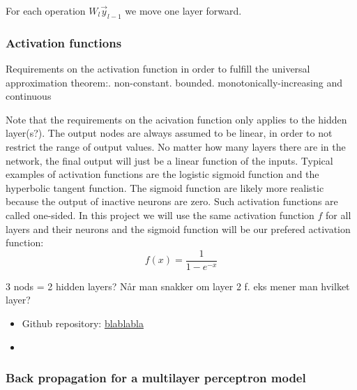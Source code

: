 \documentclass[a4paper,12pt]{article}
\begin{document}
For each operation $W_l \Vec{y}_{l-1}$ we move one layer forward.\newline


\subsubsection{Activation functions}
Requirements on the activation function in order to fulfill the universal approximation theorem:. non-constant. bounded. monotonically-increasing and continuous\newline

Note that the requirements on the acivation function only applies to the hidden layer(s?). The output nodes are always assumed to be linear, in order to not restrict the range of output values. No matter how many layers there are in the network, the final output will just be a linear function of the inputs.\newline
Typical examples of activation functions are the logistic sigmoid function and the hyperbolic tangent function. The sigmoid function are likely more realistic because the output of inactive neurons are zero. Such activation functions are called one-sided. In this project we will use the same activation function $f$ for all layers and their neurons and the sigmoid function will be our prefered activation function: 
\begin{equation}
    f(x) = \frac{1}{ 1 - e^{-x} }
\end{equation}



3 nods = 2 hidden layers? Når man snakker om layer 2 f. eks mener man hvilket layer?\newline

\begin{itemize}
\item Github repository: \url{blablabla}
\item
\end{itemize}

\subsubsection{Back propagation for a multilayer perceptron model}
\end{document}
